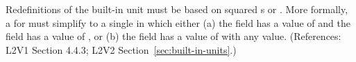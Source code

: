 Redefinitions of the built-in unit  must be based on squared
s or .  More formally, a \UnitDefinition
for  must simplify to a single \Unit in which either (a) the
 field has a value of  and the 
field has a value of , or (b) the  field has a value
of  with any  value.  (References:
L2V1 Section 4.4.3; L2V2 Section~\ref{sec:built-in-units}.)
